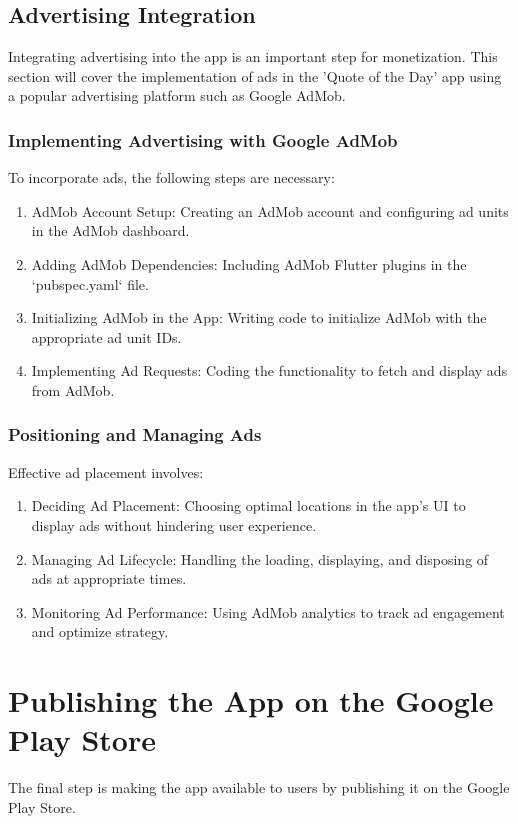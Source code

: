 \documentclass{book}
\begin{document}
\subsection{Advertising Integration}
Integrating advertising into the app is an important step for monetization. This section will cover the implementation of ads in the 'Quote of the Day' app using a popular advertising platform such as Google AdMob.

\subsubsection{Implementing Advertising with Google AdMob}
To incorporate ads, the following steps are necessary:
\begin{enumerate}
    \item AdMob Account Setup: Creating an AdMob account and configuring ad units in the AdMob dashboard.
    \item Adding AdMob Dependencies: Including AdMob Flutter plugins in the `pubspec.yaml` file.
    \item Initializing AdMob in the App: Writing code to initialize AdMob with the appropriate ad unit IDs.
    \item Implementing Ad Requests: Coding the functionality to fetch and display ads from AdMob.
\end{enumerate}

\subsubsection{Positioning and Managing Ads}
Effective ad placement involves:
\begin{enumerate}
    \item Deciding Ad Placement: Choosing optimal locations in the app's UI to display ads without hindering user experience.
    \item Managing Ad Lifecycle: Handling the loading, displaying, and disposing of ads at appropriate times.
    \item Monitoring Ad Performance: Using AdMob analytics to track ad engagement and optimize strategy.
\end{enumerate}

\section{Publishing the App on the Google Play Store}
The final step is making the app available to users by publishing it on the Google Play Store.
\end{document}
